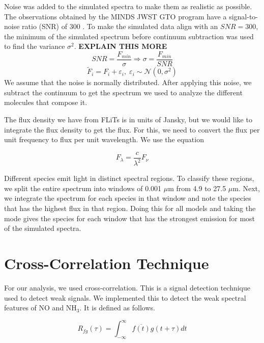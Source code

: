 \documentclass[twoside, single, authoryear, semicolon, 12pt]{lion-msc}
\newcommand{\4}{$_4$}
\newcommand{\3}{$_3$}
\newcommand{\2}{$_2$}
\begin{document}
Noise was added to the simulated spectra to make them as realistic as possible. The observations obtained by the MINDS JWST GTO program have a signal-to-noise ratio (SNR) of 300 \citep{henning2024mindsjwstmirimidinfrared}.  To make the simulated data align with an $SNR = 300$, the minimum of the simulated spectrum before continuum subtraction was used to find the variance $\sigma^2$. \textbf{EXPLAIN THIS MORE}
\begin{equation}
    SNR = \frac{F_{min}}{\sigma}\Rightarrow\sigma=\frac{F_{min}}{SNR}
\end{equation}
\begin{equation}
    \tilde{F}_i = F_i + \varepsilon_i,\;\varepsilon_i\sim\mathcal{N}(0, \sigma^2)
\end{equation}
We assume that the noise is normally distributed. After applying this noise, we subtract the continuum to get the spectrum we used to analyze the different molecules that compose it.


The flux density we have from FLiTs is in units of Jansky, but we would like to integrate the flux density to get the flux. For this, we need to convert the flux per unit frequency to flux per unit wavelength. We use the equation

\begin{equation}
    F_\lambda=\frac{c}{\lambda^2}F_\nu
\end{equation}

Different species emit light in distinct spectral regions. To classify these regions, we split the entire spectrum into windows of 0.001 $\mu$m from 4.9 to 27.5 $\mu$m. Next, we integrate the spectrum for each species in that window and note the species that has the highest flux in that region. Doing this for all models and taking the mode gives the species for each window that has the strongest emission for most of the simulated spectra.  


\section{Cross-Correlation Technique}
For our analysis, we used cross-correlation. This is a signal detection technique used to detect weak signals. We implemented this to detect the weak spectral features of NO and NH\3. It is defined as follows. 

\begin{equation}
    R_{fg}(\tau)=\int^\infty_{-\infty}\overline{f(t)}g(t+\tau)dt
\end{equation}
\end{document}
